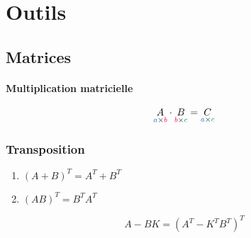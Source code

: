 \documentclass[resume]{subfiles}
\begin{document}
\section{Outils}
\subsection{Matrices}
\paragraph{Multiplication matricielle}
$$\underset{\textcolor{RoyalBlue}{a}\times \textcolor{OrangeRed}{b}}{A}\cdot \underset{\textcolor{OrangeRed}{b}\times \textcolor{ForestGreen}{c}}{B}=\underset{\textcolor{RoyalBlue}{a}\times \textcolor{ForestGreen}{c}}{C}$$
\subsubsection{Transposition}
\begin{enumerate}
\item $(A+B)^T=A^T+B^T$
\item $(AB)^T=B^TA^T$
\end{enumerate}

\begin{equation}
\boxed{A-BK=\left(A^T-K^TB^T  \right)^{T}}
\label{transpose_matrice}
\end{equation}
\end{document}
